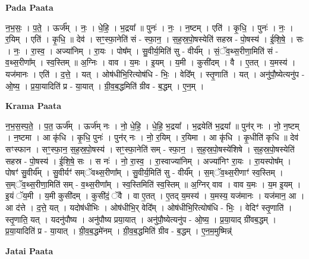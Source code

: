 \documentclass[17pt]{extarticle}
\begin{document}
\textbf{Pada Paata} \newline

न॒भ॒सः॒ । प॒ते॒ । ऊर्ज᳚म् । नः॒ । धे॒हि॒ । भ॒द्रया᳚ ॥ पुनः॑ । नः॒ । न॒ष्टम् । एति॑ । कृ॒धि॒ । पुनः॑ । नः॒ । र॒यिम् । एति॑ । कृ॒धि॒ ॥ देव॑ । सꣳ॒॒स्फा॒नेति॑ सं - स्फा॒न॒ । स॒ह॒स्र॒पो॒षस्येति॑ सहस्र - पो॒षस्य॑ । ई॒शि॒षे॒ । सः । नः॒ । रा॒स्व॒ । अज्या॑निम् । रा॒यः । पोष᳚म् । सु॒वीर्य॒मिति॑ सु - वीर्य᳚म् । सं॒ॅव॒थ्स॒रीणा॒मिति॑ सं - व॒थ्स॒रीणा᳚म् । स्व॒स्तिम् ॥ अ॒ग्निः । वाव । य॒मः । इ॒यम् । य॒मी । कुसी॑दम् । वै । ए॒तत् । य॒मस्य॑ । यज॑मानः । एति॑ । द॒त्ते॒ । यत् । ओष॑धीभि॒रित्योष॑धि - भिः॒ । वेदि᳚म् । स्तृ॒णाति॑ । यत् । अनु॑पौ॒ष्येत्यनु॑प - ओ॒ष्य॒ । प्र॒या॒यादिति॑ प्र - या॒यात् । ग्री॒व॒ब॒द्धमिति॑ ग्रीव - ब॒द्धम् । ए॒न॒म् ।  \newline


\textbf{Krama Paata} \newline

न॒भ॒स॒स्प॒ते॒ । प॒त॒ ऊर्ज᳚म् । ऊर्ज॑म् नः । नो॒ धे॒हि॒ । धे॒हि॒ भ॒द्रया᳚ । भ॒द्रयेति॑ भ॒द्रया᳚ ॥ पुन॑र् नः । नो॒ न॒ष्टम् । न॒ष्टमा । आ कृ॑धि । कृ॒धि॒ पुनः॑ । पुन॑र् नः । नो॒ र॒यिम् । र॒यिमा । आ कृ॑धि । कृ॒धीति॑ कृधि ॥ देव॑ सꣳस्फान । सꣳ॒॒स्फा॒न॒ स॒ह॒स्र॒पो॒षस्य॑ । सꣳ॒॒स्फा॒नेति॑ सम् - स्फा॒न॒ । स॒ह॒स्र॒पो॒षस्ये॑शिषे । स॒ह॒स्र॒पो॒षस्येति॑ सहस्र - पो॒षस्य॑ । ई॒शि॒षे॒ सः । स नः॑ । नो॒ रा॒स्व॒ । रा॒स्वाज्या॑निम् । अज्या॑निꣳ रा॒यः । रा॒यस्पोष᳚म् । पोषꣳ॑ सु॒वीर्य᳚म् । सु॒वीर्यꣳ॑ सम्ॅवथ्स॒रीणा᳚म् । सु॒वीर्य॒मिति॑ सु - वीर्य᳚म् । स॒म्ॅव॒थ्स॒रीणाꣳ॑ स्व॒स्तिम् । स॒म्ॅव॒थ्स॒रीणा॒मिति॑ सम् - व॒थ्स॒रीणा᳚म् । स्व॒स्तिमिति॑ स्व॒स्तिम् ॥ अ॒ग्निर् वाव । वाव य॒मः । य॒म इ॒यम् । इ॒यं ॅय॒मी । य॒मी कुसी॑दम् । कुसी॑दं॒ ॅवै । वा ए॒तत् । ए॒तद् य॒मस्य॑ । य॒मस्य॒ यज॑मानः । यज॑मान॒ आ । आ द॑त्ते । द॒त्ते॒ यत् । यदोष॑धीभिः । ओष॑धीभि॒र् वेदि᳚म् । ओष॑धीभि॒रित्योष॑धि - भिः॒ । वेदिꣳ॑ स्तृ॒णाति॑ । स्तृ॒णाति॒ यत् । यदनु॑पौष्य । अनु॑पौष्य प्रया॒यात् । अनु॑पौ॒ष्येत्यनु॑प - ओ॒ष्य॒ । प्र॒या॒याद् ग्री॑वब॒द्धम् । प्र॒या॒यादिति॑ प्र - या॒यात् । ग्री॒व॒ब॒द्धमे॑नम् । ग्री॒व॒ब॒द्धमिति॑ ग्रीव - ब॒द्धम् । ए॒न॒म॒मुष्मिन्न्॑ \newline

\textbf{Jatai Paata} \newline
\end{document}
